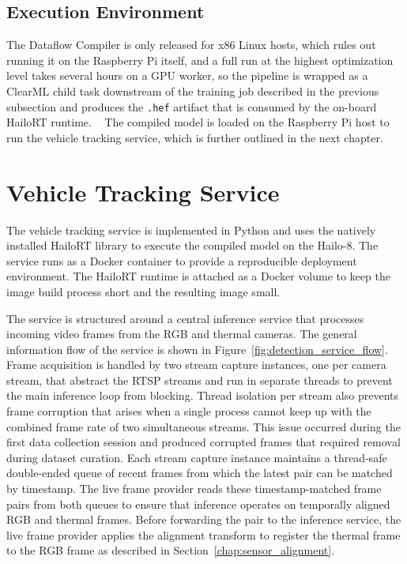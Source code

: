 \documentclass[12pt,oneside,bibtotoc,liststotoc]{scrbook}
\begin{document}
\subsection{Execution Environment}

The Dataflow Compiler is only released for x86 Linux hosts, which
rules out running it on the Raspberry Pi itself, and a full run at
the highest optimization level takes several hours on a GPU worker,
so the pipeline is wrapped as a ClearML child task downstream of the
training job described in the previous subsection and produces the
\texttt{.hef} artifact that is consumed by the on-board HailoRT runtime.
~\cite{hailoDataflowCompilerUserGuide}
The compiled model is loaded on the Raspberry Pi host to run the
vehicle tracking service, which is further outlined in the next chapter.

\vspace{-2em}
\section{Vehicle Tracking Service}
\vspace{-0.5em}

The vehicle tracking service is implemented in Python and uses the natively
installed HailoRT library to execute the compiled model on the Hailo-8.
The service runs as a Docker container to provide a reproducible deployment
environment. The HailoRT runtime is attached as a Docker volume to keep the
image build process short and the resulting image small.

The service is structured around a central inference service that processes
incoming video frames from the RGB and thermal cameras.
The general information flow of the service is shown in
Figure~\ref{fig:detection_service_flow}.
Frame acquisition is handled by two stream capture instances, one per camera
stream, that abstract the RTSP streams and run in separate threads to prevent
the main inference loop from blocking.
Thread isolation per stream also prevents frame corruption that arises when a
single process cannot keep up with the combined frame rate of two simultaneous
streams.
This issue occurred during the first data collection session and produced
corrupted frames that required removal during dataset curation.
Each stream capture instance maintains a thread-safe double-ended queue of
recent frames from which the latest pair can be matched by timestamp.
The live frame provider reads these timestamp-matched frame pairs from both
queues to ensure that inference operates on temporally aligned RGB and thermal
frames.
Before forwarding the pair to the inference service, the live frame provider
applies the alignment transform to register the thermal frame to the RGB frame
as described in Section~\ref{chap:sensor_alignment}.
\end{document}
